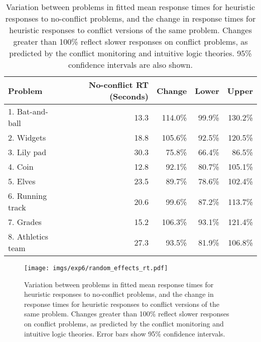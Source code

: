 \begin{table}[h]
  \centering
  \caption[]{
    Variation between problems in
    fitted mean response times for
    heuristic responses to no-conflict problems,
    and the change in response times
    for heuristic responses to conflict versions of the same problem.
    Changes greater than 100\% reflect
    slower responses on conflict problems,
    as predicted by the conflict monitoring
    and intuitive logic theories.
    95\% confidence intervals are also shown.
    \label{tab:exp6-appendix-table}
  }
  \begin{tabular}{lrrrr}
    \toprule
    Problem           & No-conflict RT (Seconds) & Change& Lower  & Upper\\
    \midrule
    1. Bat-and-ball   & 13.3           & 114.0\%               & 99.9\% & 130.2\%\\
    2. Widgets        & 18.8           & 105.6\%               & 92.5\% & 120.5\%\\
    3. Lily pad       & 30.3           & 75.8\%                & 66.4\% & 86.5\%\\
    4. Coin           & 12.8           & 92.1\%                & 80.7\% & 105.1\%\\
    5. Elves          & 23.5           & 89.7\%                & 78.6\% & 102.4\%\\
    6. Running track  & 20.6           & 99.6\%                & 87.2\% & 113.7\%\\
    7. Grades         & 15.2           & 106.3\%               & 93.1\% & 121.4\%\\
    8. Athletics team & 27.3           & 93.5\%                & 81.9\% & 106.8\%\\
    \bottomrule
  \end{tabular}
\end{table}

\begin{figure}[h]
  \centering
  \texttt{[image: imgs/exp6/random\_effects\_rt.pdf]}
  \caption[]{
    Variation between problems in
    fitted mean response times for
    heuristic responses to no-conflict problems,
    and the change in response times
    for heuristic responses to conflict versions of the same problem.
    Changes greater than 100\% reflect
    slower responses on conflict problems,
    as predicted by the conflict monitoring
    and intuitive logic theories.
    Error bars show 95\% confidence intervals.    
    \label{fig:exp6-appendix-figure}
  }
\end{figure}
